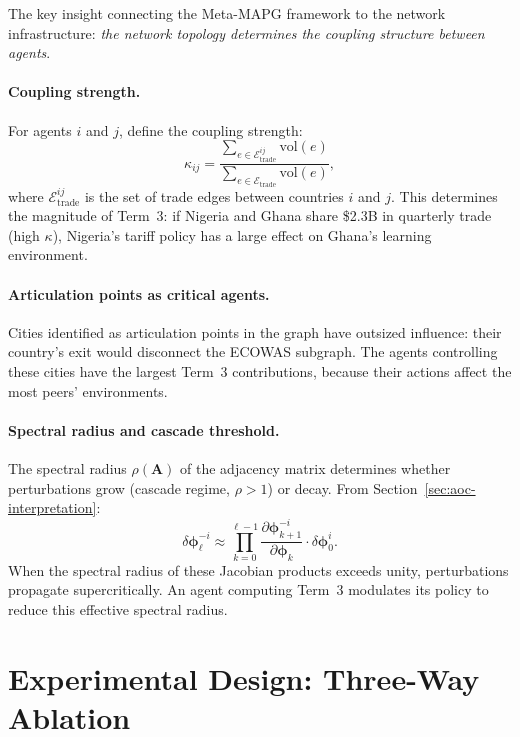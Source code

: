 The key insight connecting the Meta-MAPG framework to the network infrastructure: \emph{the network topology determines the coupling structure between agents}.

\paragraph{Coupling strength.} For agents $i$ and $j$, define the coupling strength:
\begin{equation}\label{eq:coupling}
  \kappa_{ij} = \frac{\sum_{e \in \mathcal{E}^{ij}_{\text{trade}}} \text{vol}(e)}{\sum_{e \in \mathcal{E}_{\text{trade}}} \text{vol}(e)},
\end{equation}
where $\mathcal{E}^{ij}_{\text{trade}}$ is the set of trade edges between countries $i$ and $j$. This determines the magnitude of Term~3: if Nigeria and Ghana share \$2.3B in quarterly trade (high $\kappa$), Nigeria's tariff policy has a large effect on Ghana's learning environment.

\paragraph{Articulation points as critical agents.} Cities identified as articulation points in the graph have outsized influence: their country's exit would disconnect the ECOWAS subgraph. The agents controlling these cities have the largest Term~3 contributions, because their actions affect the most peers' environments.

\paragraph{Spectral radius and cascade threshold.} The spectral radius $\rho(\mathbf{A})$ of the adjacency matrix determines whether perturbations grow (cascade regime, $\rho > 1$) or decay. From Section~\ref{sec:aoc-interpretation}:
\begin{equation}
  \delta\bm{\phi}_\ell^{-i} \approx \prod_{k=0}^{\ell-1} \frac{\partial\bm{\phi}_{k+1}^{-i}}{\partial\bm{\phi}_k} \cdot \delta\bm{\phi}_0^i.
\end{equation}
When the spectral radius of these Jacobian products exceeds unity, perturbations propagate supercritically. An agent computing Term~3 modulates its policy to reduce this effective spectral radius.

\section{Experimental Design: Three-Way Ablation}
\label{sec:ablation}

